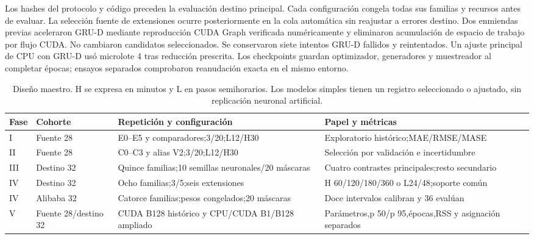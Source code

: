 Los hashes del protocolo y código preceden la evaluación destino principal. Cada configuración congela todas sus familias y recursos antes de evaluar. La selección fuente de extensiones ocurre posteriormente en la cola automática sin reajustar a errores destino. Dos enmiendas previas aceleraron GRU-D mediante reproducción CUDA Graph verificada numéricamente y eliminaron acumulación de espacio de trabajo por flujo CUDA. No cambiaron candidatos seleccionados. Se conservaron siete intentos GRU-D fallidos y reintentados. Un ajuste principal de CPU con GRU-D usó microlote 4 tras reducción prescrita. Los checkpoints guardan optimizador, generadores y muestreador al completar épocas; ensayos separados comprobaron reanudación exacta en el mismo entorno.

\begin{table}[!t]
\caption{Diseño maestro. H se expresa en minutos y L en pasos semihorarios. Los modelos simples tienen un registro seleccionado o ajustado, sin replicación neuronal artificial.}\label{tab:master}
\centering\footnotesize
\begin{tabularx}{\linewidth}{p{.11\linewidth}p{.16\linewidth}p{.28\linewidth}X}
\toprule Fase & Cohorte & Repetición y configuración & Papel y métricas \\\midrule
I & Fuente 28 & E0--E5 y comparadores;3/20;L12/H30 & Exploratorio histórico;MAE/RMSE/MASE \\
II & Fuente 28 & C0--C3 y alias V2;3/20;L12/H30 & Selección por validación e incertidumbre \\
III & Destino 32 & Quince familias;10 semillas neuronales/20 máscaras & Cuatro contrastes principales;resto secundario \\
IV & Destino 32 & Ocho familias;3/5;seis extensiones & H 60/120/180/360 o L24/48;soporte común \\
IV & Alibaba 32 & Catorce familias;pesos congelados;20 máscaras & Doce intervalos calibran y 36 evalúan \\
V & Fuente 28/destino 32 & CUDA B128 histórico y CPU/CUDA B1/B128 ampliado & Parámetros,p 50/p 95,épocas,RSS y asignación separados \\
\bottomrule\end{tabularx}
\end{table}

